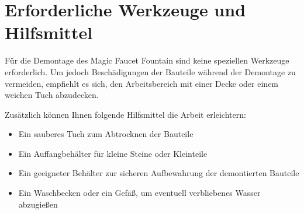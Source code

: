 %
%
%

\chapter{Erforderliche Werkzeuge und Hilfsmittel}
Für die Demontage des Magic Faucet Fountain sind keine speziellen Werkzeuge erforderlich. Um jedoch Beschädigungen der Bauteile während der Demontage zu vermeiden, empfiehlt es sich, den Arbeitsbereich mit einer Decke oder einem weichen Tuch abzudecken.

Zusätzlich können Ihnen folgende Hilfsmittel die Arbeit erleichtern:
\begin{itemize}
	\item Ein sauberes Tuch zum Abtrocknen der Bauteile
	\item Ein Auffangbehälter für kleine Steine oder Kleinteile
	\item Ein geeigneter Behälter zur sicheren Aufbewahrung der demontierten Bauteile
	\item Ein Waschbecken oder ein Gefäß, um eventuell verbliebenes Wasser abzugießen
\end{itemize}

